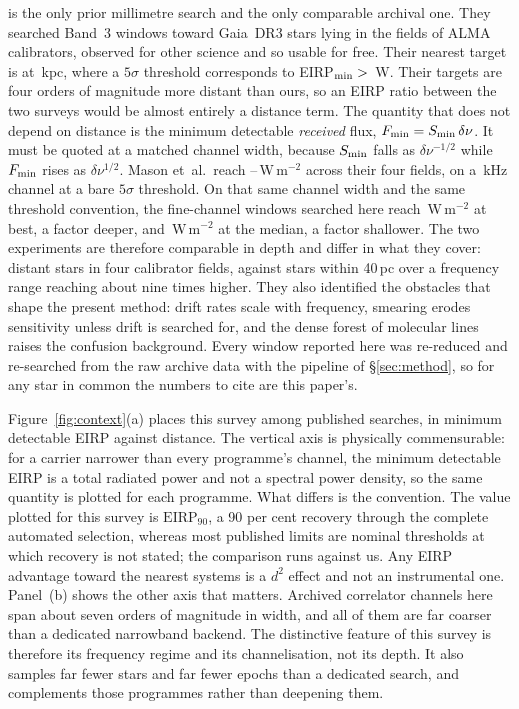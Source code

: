 \citet{Mason2025} is the only prior millimetre search and the only
comparable archival one. They searched Band~3 windows toward
\MasonNStar{} Gaia~DR3 stars lying in the fields of \MasonNCal{} ALMA
calibrators, observed for other science and so usable for free. Their
nearest target is at \MasonNearKpc\,kpc, where a $5\sigma$ threshold
corresponds to EIRP$_{\rm min}>{}$\MasonNearEirp\,W. Their targets are
four orders of magnitude more distant than ours, so an EIRP ratio between
the two surveys would be almost entirely a distance term. The quantity
that does not depend on distance is the minimum detectable \emph{received}
flux, $F_{\rm min}=S_{\rm min}\,\delta\nu$. It must be quoted at a matched
channel width, because $S_{\rm min}$ falls as $\delta\nu^{-1/2}$ while
$F_{\rm min}$ rises as $\delta\nu^{1/2}$. Mason
et~al.\ reach \MasonFluxLo--\MasonFluxHi\,W\,m$^{-2}$ across their four
fields, on a \MasonChanKHz\,kHz channel at a bare $5\sigma$ threshold. On
that same channel width and the same threshold convention, the
fine-channel windows searched here reach \FluxMatchBest\,W\,m$^{-2}$ at
best, a factor \FluxBestRatio{} deeper, and \FluxMatchMed\,W\,m$^{-2}$ at
the median, a factor \FluxMedRatio{} shallower. The two experiments are
therefore comparable in depth and differ in what they cover: distant
stars in four calibrator fields, against \NStars{} stars within 40\,pc
over a frequency range reaching about nine times higher. They also
identified the obstacles that shape the present method: drift rates scale
with frequency, smearing erodes sensitivity unless drift is searched for,
and the dense forest of molecular lines raises the confusion background.
Every window reported here was re-reduced and re-searched from the raw
archive data with the pipeline of \S\ref{sec:method}, so for any star in
common the numbers to cite are this paper's.

Figure~\ref{fig:context}(a) places this survey among published searches,
in minimum detectable EIRP against distance. The vertical axis is
physically commensurable: for a carrier narrower than every programme's
channel, the minimum detectable EIRP is a total radiated power and not a
spectral power density, so the same quantity is plotted for each
programme. What differs is the convention. The value plotted for this
survey is $\mathrm{EIRP}_{90}$, a 90 per cent recovery through the
complete automated selection, whereas most published limits are nominal
thresholds at which recovery is not stated; the comparison runs against
us. Any EIRP advantage toward the nearest systems is a $d^{2}$ effect and
not an instrumental one. Panel~(b) shows the other axis that matters.
Archived correlator channels here span about seven orders of magnitude in
width, and all of them are far coarser than a dedicated narrowband
backend. The distinctive feature of this survey is therefore its
frequency regime and its channelisation, not its depth. It also samples
far fewer stars and far fewer epochs than a dedicated search, and
complements those programmes rather than deepening them.

